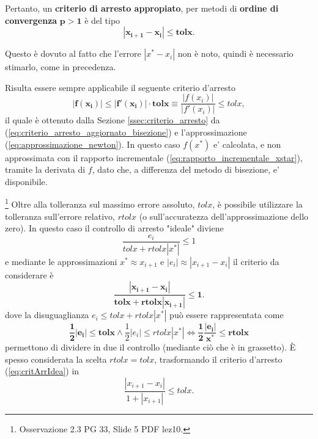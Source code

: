 Pertanto, un \textbf{criterio di arresto appropiato}, per metodi di \textbf{ordine di convergenza} $\boldsymbol{p>1}$ è del tipo
\begin{equation}\label{eq:critArrConvMag1}
	\boldsymbol{|x_{i+1}-x_i|\leq tolx}.
\end{equation}

Questo è dovuto al fatto che l'errore $|x^*-x_i|$ non è noto, quindi è necessario stimarlo, come in precedenza.

\begin{remark}\label{rem:criterio_arresto_newton}
	Risulta essere sempre applicabile il seguente criterio d'arresto
	\begin{equation}\label{eq:criterio_arresto_newton}
		\boldsymbol{|f(x_i)|\leq |f'(x_i)|\cdot tolx}\equiv \frac{|f(x_i)|}{|f'(x_i)|}\leq tolx,
	\end{equation}
	il quale è ottenuto dalla Sezione \ref{ssec:criterio_arresto} da (\ref{eq:criterio_arresto_aggiornato_bisezione}) e l'approssimazione (\ref{eq:approssimazione_newton}). In questo caso $f(x^*)$ e' calcolata, e non approssimata con il rapporto incrementale (\ref{eq:rapporto_incrementale_xstar}), tramite la derivata di $f$, dato che, a differenza del metodo di bisezione, e' disponibile.
\end{remark}

\begin{remark}\footnote{Osservazione 2.3 PG 33, Slide 5 PDF lez10.}
	Oltre alla tolleranza sul massimo errore assoluto, $tolx$, è possibile utilizzare la tolleranza sull'errore relativo, $rtolx$ (o sull'accuratezza dell'approssimazione dello zero). In questo caso il controllo di arresto "ideale" diviene
	\begin{equation*}
		\frac{e_i}{tolx+rtolx|x^*|}\leq 1
	\end{equation*}
	e mediante le approssimazioni $x^*\approx x_{i+1}$ e $|e_i|\approx |x_{i+1}-x_i|$ il criterio da considerare è
	\begin{equation}\label{eq:critArrIdea}
		\boldsymbol{\frac{|x_{i+1}-x_i|}{tolx+rtolx|x_{i+1}|}\leq 1}.
	\end{equation}
	dove la disuguaglianza $e_i\leq tolx+rtolx|x^*|$ può essere rappresentata come
	\begin{equation*}
		\boldsymbol{\frac{1}{2}|e_i|\leq tolx} \wedge \frac{1}{2}|e_i|\leq rtolx|x^*| \iff \boldsymbol{\frac{1}{2}\frac{|e_i|}{x^*}\leq rtolx}
	\end{equation*}
	permettono di dividere in due il controllo (mediante ciò che è in grassetto). È spesso considerata la scelta $rtolx=tolx$, trasformando il criterio d'arresto (\ref{eq:critArrIdea}) in
	\begin{equation*}
		\frac{|x_{i+1}-x_i|}{1+|x_{i+1}|}\leq tolx.
	\end{equation*}
\end{remark}

